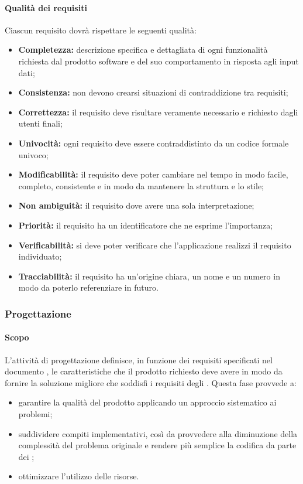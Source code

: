 \paragraph{Qualità dei requisiti}
Ciascun requisito dovrà rispettare le seguenti qualità:
\begin {itemize}
	\item \textbf{Completezza:} descrizione specifica e dettagliata di ogni funzionalità richiesta dal prodotto software e del suo comportamento in risposta agli input dati;
	\item \textbf{Consistenza:} non devono crearsi situazioni di contraddizione tra requisiti;
	\item \textbf{Correttezza:} il requisito deve risultare veramente necessario e richiesto dagli utenti finali;
	\item \textbf{Univocità:} ogni requisito deve essere contraddistinto da un codice formale univoco;
	\item \textbf{Modificabilità:} il requisito deve poter cambiare nel tempo in modo facile, completo, consistente e in modo da mantenere la struttura e lo stile;
	\item \textbf{Non ambiguità:} il requisito dove avere una sola interpretazione;
	\item \textbf{Priorità:} il requisito ha un identificatore che ne esprime l'importanza;
	\item \textbf{Verificabilità:} si deve poter verificare che l'applicazione realizzi il requisito individuato;
	\item \textbf{Tracciabilità:} il requisito ha un'origine chiara, un nome e un numero in modo da poterlo referenziare in futuro.
\end{itemize}
\subsubsection{Progettazione}
\paragraph{Scopo}
L'attività di progettazione definisce, in funzione dei requisiti specificati nel documento \AdR{}, le caratteristiche che il prodotto richiesto deve avere in modo da fornire la soluzione migliore che soddisfi i requisiti degli . Questa fase provvede a:
\begin{itemize}
\item garantire la qualità del prodotto applicando un approccio sistematico ai problemi;
\item suddividere compiti implementativi, così da provvedere alla diminuzione della complessità del problema originale e rendere più semplice la codifica da parte dei \progrs{};
\item ottimizzare l'utilizzo delle risorse.
\end{itemize}
